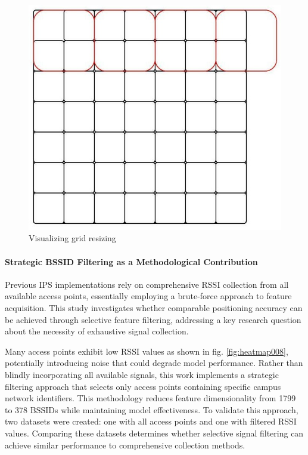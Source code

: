 \documentclass[runningheads]{llncs}
\begin{document}
\vspace{-5pt}
\begin{figure}[htbp]
	\centerline{\includegraphics[scale=0.5]{image14.jpg}}
	\caption{Visualizing grid resizing}
	\label{fig:vis_grid_resize}
\end{figure}
\vspace{-10pt}

\paragraph{Strategic BSSID Filtering as a Methodological Contribution} Previous IPS implementations \cite{LRE1} rely on comprehensive RSSI collection from all available access points, essentially employing a brute-force approach to feature acquisition. This study investigates whether comparable positioning accuracy can be achieved through selective feature filtering, addressing a key research question about the necessity of exhaustive signal collection.

Many access points exhibit low RSSI values as shown in fig. \ref{fig:heatmap008}, potentially introducing noise that could degrade model performance. Rather than blindly incorporating all available signals, this work implements a strategic filtering approach that selects only access points containing specific campus network identifiers. This methodology reduces feature dimensionality from 1799 to 378 BSSIDs while maintaining model effectiveness. To validate this approach, two datasets were created: one with all access points and one with filtered RSSI values. Comparing these datasets determines whether selective signal filtering can achieve similar performance to comprehensive collection methods.
\end{document}
